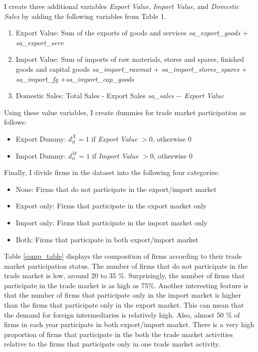 \documentclass[12pt]{article}
\begin{document}
I create three additional variables \textit{Export Value},
\textit{Import Value}, and
\textit{Domestic Sales}
by adding the following variables from Table 1.  
\begin{enumerate}
\item Export Value: Sum of the exports of goods and services \textit{sa\_export\_goods $+$ sa\_export\_serv}
\item Import Value: Sum of imports of raw materials, stores and spares,
  finished goods and capital goods \textit{sa\_import\_rawmat $+$        sa\_import\_stores\_spares
  $+$ sa\_import\_fg            $+$sa\_import\_cap\_goods}
\item Domestic Sales: Total Sales - Export Sales \textit{sa\_sales $-$ Export Value}
\end{enumerate}
Using these value variables, I create dummies for trade market
participation as follows:
\begin{itemize}
\item Export Dummy: $d_{it}^{X}=1$ if \textit{Export Value} $> 0$,
  otherwise $0$
\item Import Dummy: $d_{it}^{M}=1$ if \textit{Import Value} $> 0$, otherwise $0$
\end{itemize} 

Finally, I divide firms in the dataset into the following four categories:
\begin{itemize}
\item None: Firms that do not participate in the export/import market
\item Export only: Firms that participate in the export market only
\item Import only: Firms that participate in the import market only
\item Both: Firms that participate in both export/import market
\end{itemize}

Table \ref{comp_table} displays the composition of firms according to their trade market
participation status. The number of firms that do not
participate in the trade market is low, around 20 to 35
\%. Surprisingly, the number of firms that participate in the trade
market is as high as 75\%. Another interesting feature is that the number
of firms that participate only in the import market is higher than the
firms that participate only in the export market. This can mean that
the demand for foreign intermediaries is relatively high. Also, almost 50 \% of
firms in each year participate in both export/import market. There is
a very high proportion of firms that participate in the both the trade market activities relative to the firms that
participate only in one trade market activity. 
\end{document}
